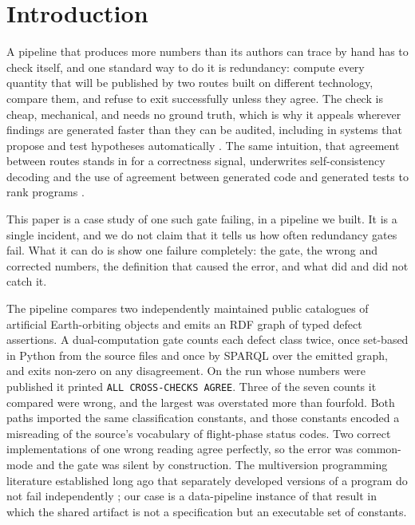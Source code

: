 \section{Introduction}

A pipeline that produces more numbers than its authors can trace by hand has to
check itself, and one standard way to do it is redundancy: compute every
quantity that will be published by two routes built on different technology,
compare them, and refuse to exit successfully unless they agree. The check is
cheap, mechanical, and needs no ground truth, which is why it appeals wherever
findings are generated faster than they can be audited, including in systems
that propose and test hypotheses automatically \citep{lu2024aiscientist}. The
same intuition, that agreement between routes stands in for a correctness
signal, underwrites self-consistency decoding \citep{wang2023selfconsistency}
and the use of agreement between generated code and generated tests to rank
programs \citep{chen2023codet}.

This paper is a case study of one such gate failing, in a pipeline we built. It
is a single incident, and we do not claim that it tells us how often redundancy
gates fail. What it can do is show one failure completely: the gate, the wrong
and corrected numbers, the definition that caused the error, and what did and
did not catch it.

The pipeline compares two independently maintained public catalogues of
artificial Earth-orbiting objects and emits an RDF graph of typed defect
assertions. A dual-computation gate counts each defect class twice, once
set-based in Python from the source files and once by SPARQL over the emitted
graph, and exits non-zero on any disagreement. On the run whose numbers were
published it printed \texttt{ALL CROSS-CHECKS AGREE}. Three of the seven counts
it compared were wrong, and the largest was overstated more than fourfold. Both
paths imported the same classification constants, and those constants encoded a
misreading of the source's vocabulary of flight-phase status codes. Two correct
implementations of one wrong reading agree perfectly, so the error was
common-mode and the gate was silent by construction. The multiversion
programming literature established long ago that separately developed versions
of a program do not fail independently
\citep{knight1986experimental, eckhardt1985theoretical, littlewood1989conceptual};
our case is a data-pipeline instance of that result in which the shared artifact
is not a specification but an executable set of constants.

